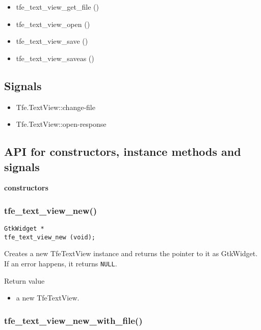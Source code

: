 \begin{itemize}
\tightlist
\item
  tfe\_text\_view\_get\_file ()
\item
  tfe\_text\_view\_open ()
\item
  tfe\_text\_view\_save ()
\item
  tfe\_text\_view\_saveas ()
\end{itemize}

\subsection{Signals}\label{signals}

\begin{itemize}
\tightlist
\item
  Tfe.TextView::change-file
\item
  Tfe.TextView::open-response
\end{itemize}

\subsection{API for constructors, instance methods and
signals}\label{api-for-constructors-instance-methods-and-signals}

\textbf{constructors}

\subsubsection{tfe\_text\_view\_new()}\label{tfe_text_view_new}

\begin{lstlisting}
GtkWidget *
tfe_text_view_new (void);
\end{lstlisting}

Creates a new TfeTextView instance and returns the pointer to it as
GtkWidget. If an error happens, it returns
\passthrough{\lstinline!NULL!}.

Return value

\begin{itemize}
\tightlist
\item
  a new TfeTextView.
\end{itemize}

\subsubsection{tfe\_text\_view\_new\_with\_file()}\label{tfe_text_view_new_with_file}

